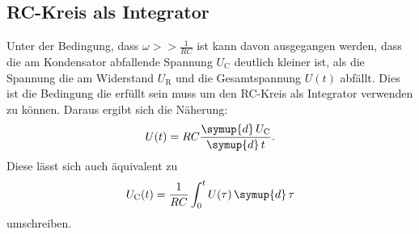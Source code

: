 \subsection{RC-Kreis als Integrator}

Unter der Bedingung, dass $\omega>>\frac{1}{RC}$ ist kann davon ausgegangen werden, dass
 die am Kondensator abfallende Spannung $U_\text{C}$ deutlich kleiner ist, als die Spannung
 die am Widerstand $U_\text{R}$ und die Gesamtspannung $U(t)$ abfällt. Dies ist die
 Bedingung die erfüllt sein muss
 um den RC-Kreis als Integrator verwenden zu können.
 Daraus ergibt sich die Näherung:
 \begin{equation}
   U(t) = R C \frac{\symup{d}\,U_\text{C}}{\symup{d}\,t}.
   \label{eqn:14}
\end{equation}
Diese lässt sich auch äquivalent zu
\begin{equation}
U_\text{C}(t)= \frac{1}{RC} \int_0^t U(\tau) \,\symup{d}\,\tau
\label{eqn:integral}
\end{equation}
umschreiben.
